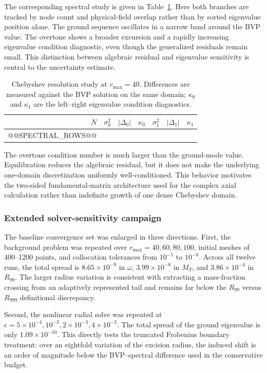 \documentclass[aps,prd,preprint,onecolumn,nofootinbib,superscriptaddress,showkeys]{revtex4-2}
\newcommand{\rmax}{r_{\mathrm{max}}}
\begin{document}
The corresponding spectral study is given in Table~\ref{tab:spectral-resolution}. Here both branches are tracked by node count and physical-field overlap rather than by sorted eigenvalue position alone. The ground sequence oscillates in a narrow band around the BVP value. The overtone shows a broader excursion and a rapidly increasing eigenvalue condition diagnostic, even though the generalized residuals remain small. This distinction between algebraic residual and eigenvalue sensitivity is central to the uncertainty estimate.

\begin{table}[!htbp]
\centering
\caption{Chebyshev resolution study at $\rmax=40$. Differences are measured against the BVP solution on the same domain; $\kappa_0$ and $\kappa_1$ are the left--right eigenvalue condition diagnostics.}
\label{tab:spectral-resolution}
\small
\setlength{\tabcolsep}{4pt}
\begin{tabular}{@{}rrrrrrr@{}}
\toprule
$N$ & $\sigma_0^2$ & $|\Delta_0|$ & $\kappa_0$ & $\sigma_1^2$ & $|\Delta_1|$ & $\kappa_1$ \\
\midrule
@@SPECTRAL_ROWS@@
\bottomrule
\end{tabular}
\end{table}

The overtone condition number is much larger than the ground-mode value. Equilibration reduces the algebraic residual, but it does not make the underlying one-domain discretization uniformly well-conditioned. This behavior motivates the two-sided fundamental-matrix architecture used for the complex axial calculation rather than indefinite growth of one dense Chebyshev domain.

\subsubsection{Extended solver-sensitivity campaign}

The baseline convergence set was enlarged in three directions. First, the background problem was repeated over $\rmax=40,60,80,100$, initial meshes of 400--1200 points, and collocation tolerances from $10^{-5}$ to $10^{-8}$. Across all twelve runs, the total spread is $8.65\times10^{-9}$ in $\omega$, $3.99\times10^{-8}$ in $M_T$, and $3.86\times10^{-4}$ in $R_{99}$. The larger radius variation is consistent with extracting a mass-fraction crossing from an adaptively represented tail and remains far below the $R_{99}$ versus $R_{999}$ definitional discrepancy.

Second, the nonlinear radial solve was repeated at $\epsilon=5\times10^{-4},10^{-3},2\times10^{-3},4\times10^{-3}$. The total spread of the ground eigenvalue is only $1.09\times10^{-10}$. This directly tests the truncated Frobenius boundary treatment: over an eightfold variation of the excision radius, the induced shift is an order of magnitude below the BVP--spectral difference used in the conservative budget.
\end{document}
